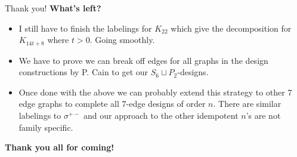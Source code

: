 \documentclass{beamer}
\theoremstyle{plain}
\begin{document}
\begin{frame}{Thank you!}
    \textbf{What's left?}
    \begin{itemize}
    \item I still have to finish the labelings for $K_{22}$ which give the decomposition for $K_{14t+8}$ where $t>0$. Going smoothly.
    \item We have to prove we can break off edges for all graphs in the design constructions by P. Cain to get our $S_{6}\sqcup P_{2}$-designs.
    \item Once done with the above we can probably extend this strategy to other 7 edge graphs to complete all 7-edge designs of order $n$. There are similar labelings to $\sigma^{+-}$ and our approach to the other idempotent $n$'s are not family specific. 
    \end{itemize}
\begin{center}
    \textbf{Thank you all for coming!}
\end{center}

    \end{frame}
\end{document}
